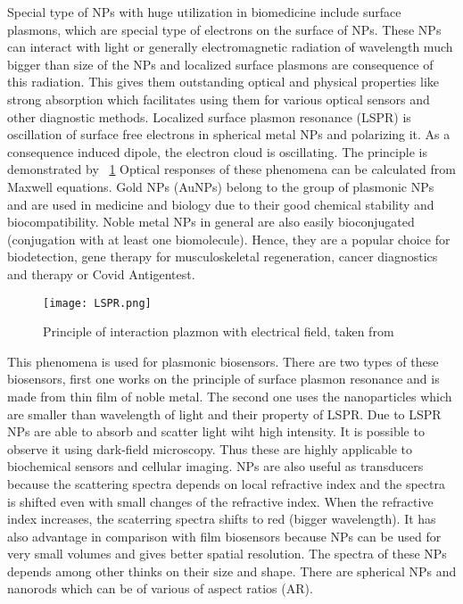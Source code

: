         Special type of NPs with huge utilization in biomedicine include surface plasmons, which are special type of electrons on the surface of NPs.
        These NPs can interact with light or generally electromagnetic radiation of wavelength much bigger than size of the NPs and localized surface
        plasmons are consequence of this radiation. This gives them outstanding optical and physical properties like strong absorption which facilitates
        using them for various optical sensors and other diagnostic methods. Localized surface plasmon resonance (LSPR) is oscillation of surface free
        electrons in spherical metal NPs and polarizing it. As a consequence induced dipole, the electron cloud is oscillating. The principle is demonstrated
        by ~\ref{fig:LSPR} Optical responses of these phenomena can be calculated from Maxwell equations. Gold NPs (AuNPs) belong to the group of plasmonic NPs
        and are used in medicine and biology due to their good chemical stability and biocompatibility. Noble metal NPs in general are also easily bioconjugated
        (conjugation with at least one biomolecule). Hence, they are a popular choice for biodetection, gene therapy for musculoskeletal regeneration,
        cancer diagnostics and therapy or Covid Antigentest. \cite{38, 39, 40, 41}

        \begin{figure}
            \texttt{[image: LSPR.png]}
            \caption{Principle of interaction plazmon with electrical field, taken from \cite{20}}
            \label{fig:LSPR}
        \end{figure}

        This phenomena is used for plasmonic biosensors. There are two types of these biosensors, first one works on the principle of surface plasmon resonance and
        is made from thin film of noble metal. The second one uses the nanoparticles which are smaller than wavelength of light and their property of LSPR.
        Due to LSPR NPs are able to absorb and scatter light wiht high intensity. It is possible to observe it using dark-field microscopy. Thus these are highly
        applicable to biochemical sensors and cellular imaging. NPs are also useful as transducers because the scattering spectra depends on local refractive index
        and the spectra is shifted even with small changes of the refractive index. When the refractive index increases, the scaterring spectra shifts to red (bigger wavelength).
        It has also advantage in comparison with film biosensors because NPs can be used for very small volumes and gives better spatial resolution.
        The spectra of these NPs depends among other thinks on their size and shape. There are spherical NPs and nanorods which can be of various of aspect ratios (AR). \cite{1, 4, 33, 34}

